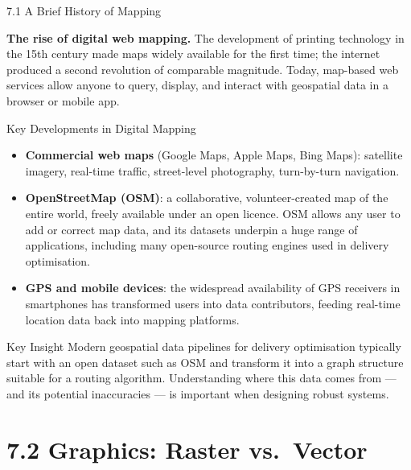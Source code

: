 \documentclass[aspectratio=169,10pt]{beamer}
\begin{document}
\begin{frame}[allowframebreaks]{7.1 A Brief History of Mapping}
  \framebreak

  \textbf{The rise of digital web mapping.}
  The development of printing technology in the 15th century made maps
  widely available for the first time; the internet produced a second
  revolution of comparable magnitude.  Today, map-based web services
  allow anyone to query, display, and interact with geospatial data in
  a browser or mobile app.

  \begin{block}{Key Developments in Digital Mapping}
    \begin{itemize}
      \item \textbf{Commercial web maps} (Google Maps, Apple Maps, Bing Maps):
            satellite imagery, real-time traffic, street-level photography,
            turn-by-turn navigation.
      \item \textbf{OpenStreetMap (OSM)}: a collaborative, volunteer-created
            map of the entire world, freely available under an open licence.
            OSM allows any user to add or correct map data, and its datasets
            underpin a huge range of applications, including many
            open-source routing engines used in delivery optimisation.
      \item \textbf{GPS and mobile devices}: the widespread availability of
            GPS receivers in smartphones has transformed users into data
            contributors, feeding real-time location data back into
            mapping platforms.
    \end{itemize}
  \end{block}

  \begin{alertblock}{Key Insight}
    Modern geospatial data pipelines for delivery optimisation typically
    start with an open dataset such as OSM and transform it into a
    graph structure suitable for a routing algorithm.  Understanding
    where this data comes from --- and its potential inaccuracies ---
    is important when designing robust systems.
  \end{alertblock}

\end{frame}

\section{7.2 Graphics: Raster vs.\ Vector}
\end{document}
